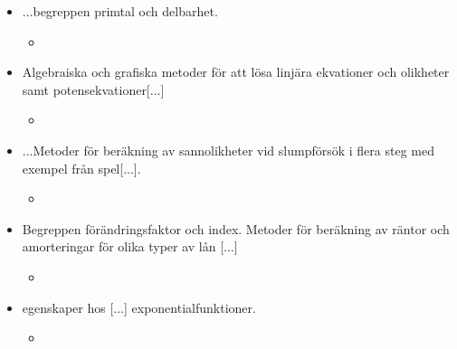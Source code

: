 \begin{itemize}
\item \lbrack...\rbrack begreppen primtal och delbarhet.
	\begin{itemize}
	\item {} 
	\end{itemize}
\item Algebraiska och grafiska metoder för att lösa linjära ekvationer och olikheter samt potensekvationer[...]
	\begin{itemize}
	\item {} 
	\end{itemize}
\item \lbrack...M\rbrack etoder för beräkning av sannolikheter vid slumpförsök i flera steg med exempel från spel[...].
	\begin{itemize}
	\item {} 
	\end{itemize}
\item Begreppen förändringsfaktor och index. Metoder för beräkning av räntor och amorteringar för olika typer av lån [...]
	\begin{itemize}
	\item {} 
	\end{itemize}
\item egenskaper hos [...] exponentialfunktioner.
	\begin{itemize}
	\item {} 
	\end{itemize}
\end{itemize}


